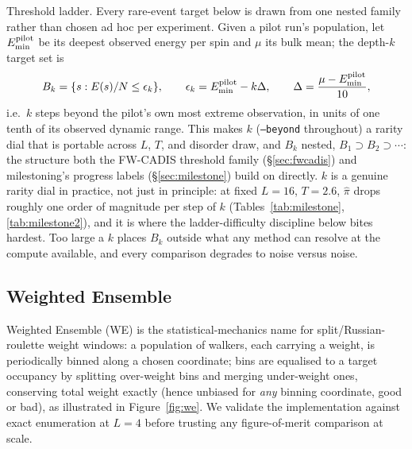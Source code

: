 \documentclass[11pt]{article}
\begin{document}
	Threshold ladder. Every rare-event target below is drawn from one nested family
	rather than chosen ad hoc per experiment. Given a pilot run's population, let
	$E^{\rm pilot}_{\min}$ be its deepest observed energy per spin and $\mu$ its bulk mean; the
	depth-$k$ target set is
	\begin{equation}
		B_k=\{s: E(s)/N\le\epsilon_k\},\qquad
		\epsilon_k=E^{\rm pilot}_{\min}-k\Delta,\qquad
		\Delta=\frac{\mu-E^{\rm pilot}_{\min}}{10},
		\label{eq:beyond}
	\end{equation}
	i.e.\ $k$ steps beyond the pilot's own most extreme observation, in units of one tenth of
	its observed dynamic range. This makes $k$ (\texttt{--beyond} throughout) a rarity dial
	that is portable across $L$, $T$, and disorder draw, and $B_k$ nested,
	$B_1\supset B_2\supset\cdots$: the structure both the FW-CADIS threshold family
	(\S\ref{sec:fwcadis}) and milestoning's progress labels (\S\ref{sec:milestone}) build on
	directly. $k$ is a genuine rarity dial in practice, not just in principle: at fixed $L=16$,
	$T=2.6$, $\hat\pi$ drops roughly one order of magnitude per step of $k$
	(Tables~\ref{tab:milestone}, \ref{tab:milestone2}), and it is where the ladder-difficulty
	discipline below bites hardest. Too large a $k$ places $B_k$ outside what any method can
	resolve at the compute available, and every comparison degrades to noise versus noise.

	\subsection{Weighted Ensemble}
	Weighted Ensemble (WE) is the statistical-mechanics name for split/Russian-roulette weight
	windows: a population of walkers, each carrying a weight, is periodically binned along a
	chosen coordinate; bins are equalised to a target occupancy by splitting over-weight bins
	and merging under-weight ones, conserving total weight exactly (hence unbiased for
	\emph{any} binning coordinate, good or bad), as illustrated in
	Figure~\ref{fig:we}. We validate the implementation against exact
	enumeration at $L=4$ before trusting any figure-of-merit comparison at scale.
	
\end{document}
